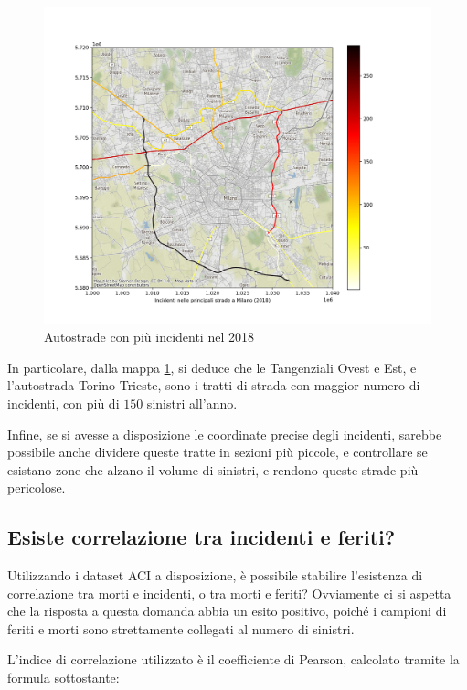 \documentclass[a4paper,12pt]{report}
\begin{document}
\begin{figure}
    \includegraphics[width=\linewidth]{../src/incidenti/incidenti_aci/autostrade/incidenti_line_chart.png}
    \caption{Autostrade con più incidenti nel 2018}
    \label{fig:line-incidenti-milano}
\end{figure}

In particolare, dalla mappa \ref{fig:line-incidenti-milano}, si deduce che le 
Tangenziali Ovest e Est, e l'autostrada Torino-Trieste, sono i tratti di 
strada con maggior numero di incidenti, con più di $150$ sinistri all'anno. 

Infine, se si avesse a disposizione le coordinate precise degli incidenti, 
sarebbe possibile anche dividere queste tratte in sezioni più piccole, 
e controllare se esistano zone che alzano il volume di sinistri, e rendono queste strade 
più pericolose. 

\subsection{Esiste correlazione tra incidenti e feriti?}

Utilizzando i dataset ACI a disposizione, è possibile stabilire l'esistenza di 
correlazione tra morti e incidenti, o tra morti e feriti?
Ovviamente ci si aspetta che la risposta a questa domanda abbia un 
esito positivo, poiché 
i campioni di feriti e morti sono strettamente collegati al numero di sinistri. 

L'indice di correlazione utilizzato è il coefficiente di Pearson, 
calcolato tramite la formula sottostante: 
\end{document}
